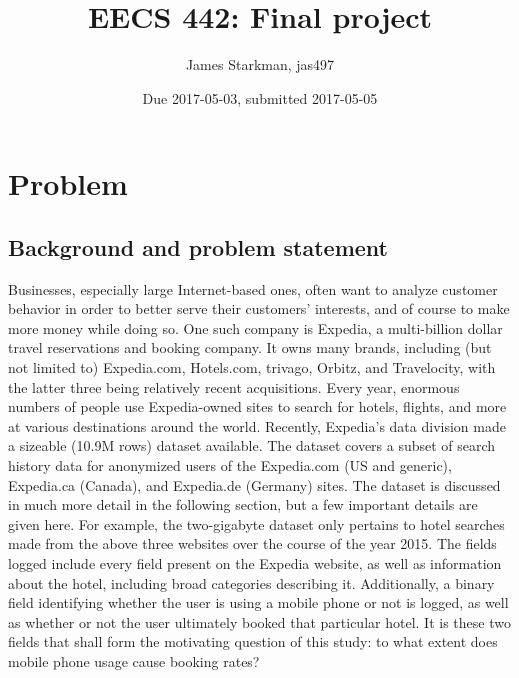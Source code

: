 \documentclass{article}
\begin{document}
\title{\vspace{-8em}EECS 442: Final project\vspace{-1em}}
\author{James Starkman, jas497}
\date{\vspace{-1ex}Due 2017-05-03, submitted 2017-05-05\vspace{-2em}}
\maketitle

\section{Problem}

\subsection{Background and problem statement}

Businesses, especially large Internet-based ones, often want to analyze customer
behavior in order to better serve their customers' interests, and of course to
make more money while doing so.  One such company is Expedia, a multi-billion
dollar travel reservations and booking company.  It owns many brands, including
(but not limited to) Expedia.com, Hotels.com, trivago, Orbitz, and Travelocity,
with the latter three being relatively recent acquisitions.  Every year,
enormous numbers of people use Expedia-owned sites to search for hotels,
flights, and more at various destinations around the world.  Recently, Expedia's
data division made a sizeable (10.9M rows) dataset available.  The dataset
covers a subset of search history data for anonymized users of the Expedia.com
(US and generic), Expedia.ca (Canada), and Expedia.de (Germany) sites.  The
dataset is discussed in much more detail in the following section, but a few
important details are given here.  For example, the two-gigabyte dataset only
pertains to hotel searches made from the above three websites over the course of
the year 2015.  The fields logged include every field present on the Expedia
website, as well as information about the hotel, including broad categories
describing it.  Additionally, a binary field identifying whether the user is
using a mobile phone or not is logged, as well as whether or not the user
ultimately booked that particular hotel.  It is these two fields that shall form
the motivating question of this study: to what extent does mobile phone usage
cause booking rates?
\end{document}

